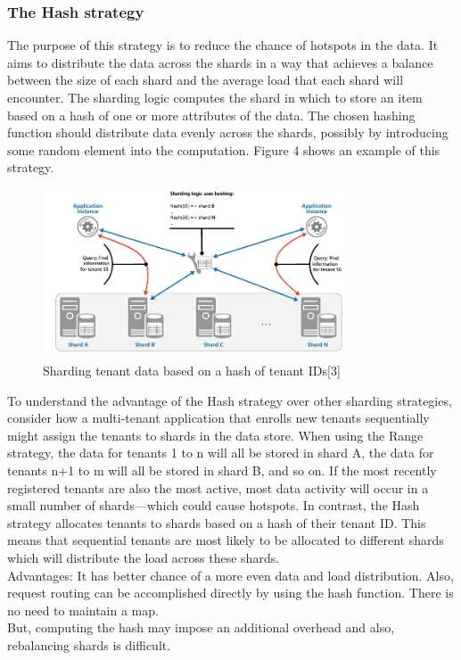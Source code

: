 \documentclass[10pt, conference]{IEEEtran}
\begin{document}
\subsubsection{The Hash strategy}
\indent The purpose of this strategy is to reduce the chance of hotspots in the data. It aims to distribute the data across the shards in a way that achieves a balance between the size of each shard and the average load that each shard will encounter. The sharding logic computes the shard in which to store an item based on a hash of one or more attributes of the data. The chosen hashing function should distribute data evenly across the shards, possibly by introducing some random element into the computation. Figure 4 shows an example of this strategy.\\
\begin{figure}[h!]
	\centering
	\includegraphics[width=9cm]{figure4.jpg}
	\caption{Sharding tenant data based on a hash of tenant IDs[3]}
\end{figure} 
\indent To understand the advantage of the Hash strategy over other sharding strategies, consider how a multi-tenant application that enrolls new tenants sequentially might assign the tenants to shards in the data store. When using the Range strategy, the data for tenants 1 to n will all be stored in shard A, the data for tenants n+1 to m will all be stored in shard B, and so on. If the most recently registered tenants are also the most active, most data activity will occur in a small number of shards—which could cause hotspots. In contrast, the Hash strategy allocates tenants to shards based on a hash of their tenant ID. This means that sequential tenants are most likely to be allocated to different shards which will distribute the load across these shards.\\
\indent Advantages: It has better chance of a more even data and load distribution. Also, request routing can be accomplished directly by using the hash function. There is no need to maintain a map.\\
\indent But, computing the hash may impose an additional overhead and also, rebalancing shards is difficult.\\
\end{document}
